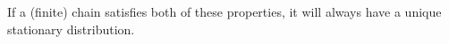 \documentclass[../main.tex]{subfiles}
\begin{document}
If a (finite) chain satisfies both of these properties, it will always have a
unique stationary distribution.

%
%
%
\end{document}

